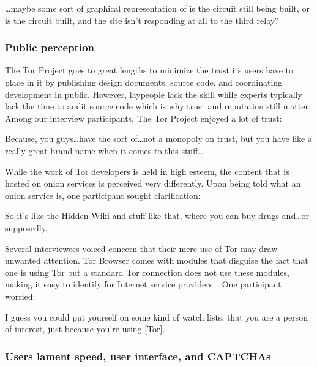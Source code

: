 \begin{displayquote}
\dots maybe some sort of graphical representation of is the circuit still
being built, or is the circuit built, and the site isn't responding at all to
the third relay?
\end{displayquote}

\subsubsection{Public perception}

The Tor Project goes to great lengths to minimize the trust its users have to
place in it by publishing design documents, source code, and coordinating
development in public.  However, laypeople lack the skill while experts
typically lack the time to audit source code which is why trust and reputation
still matter.  Among our interview participants, The Tor Project enjoyed a lot
of trust:

\begin{displayquote}
Because, you guys\dots have the sort of\dots not a monopoly on trust, but you
have like a really great brand name when it comes to this stuff\dots
\end{displayquote}

While the work of Tor developers is held in high esteem, the content that is
hosted on onion services is perceived very differently.  Upon being told what an
onion service is, one participant sought clarification:

\begin{displayquote}
So it's like the Hidden Wiki and stuff like that, where you can buy drugs
and\dots or supposedly.
\end{displayquote}

Several interviewees voiced concern that their mere use of Tor may draw unwanted
attention.  Tor Browser comes with modules that disguise the fact that one is
using Tor but a standard Tor connection does not use these modules, making it
easy to identify for Internet service providers~\cite{pluggable}.  One
participant worried:

\begin{displayquote}
I guess you could put yourself on some kind of watch lists, that you are a
person of interest, just because you're using [Tor].
\end{displayquote}

\subsubsection{Users lament speed, user interface, and CAPTCHAs}

